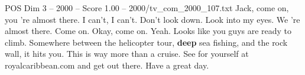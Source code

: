 \begin{textsample}{POS Dim 3 – 2000 – Score 1.00 – 2000/tv\_com\_2000\_107.txt}  \label{ex:f3_pos_088}
Jack, come on, you 're almost there.
I can't, I can't.
Don't look down.
Look into my eyes.
We 're almost there.
Come on.
Okay, come on.
Yeah.
Looks like you guys are ready to climb.
Somewhere between the helicopter tour, \textbf{deep} sea fishing, and the rock wall, it hits you.
This is way more than a cruise.
See for yourself at royalcaribbean.com and get out there.
Have a great day.

\end{textsample}
